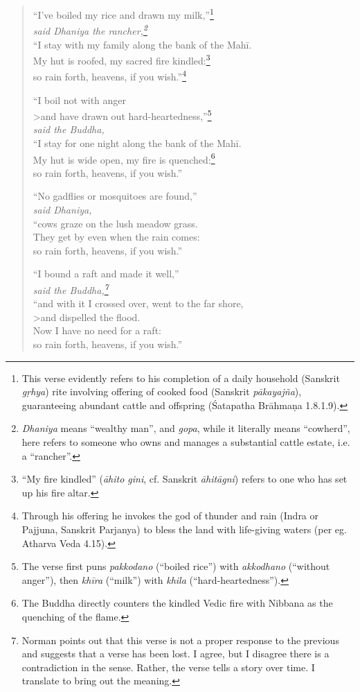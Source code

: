 \documentclass[12pt,openany]{book}%
\newcommand*{\scspeaker}[1]{\hspace{2em}\textit{#1}}
\begin{document}
\begin{verse}%
“I’ve boiled my rice and drawn my milk,”\footnote{This verse evidently refers to his completion of a daily household (Sanskrit \textit{\textsanskrit{gṛhya}}) rite involving offering of cooked food (Sanskrit \textit{\textsanskrit{pākayajña}}), guaranteeing abundant cattle and offspring (Śatapatha \textsanskrit{Brāhmaṇa} 1.8.1.9). } \\
\scspeaker{said Dhaniya the rancher,\footnote{\textit{Dhaniya} means “wealthy man”, and \textit{gopa}, while it literally means “cowherd”, here refers to someone who owns and manages a substantial cattle estate, i.e. a “rancher”. } }\\
“I stay with my family along the bank of the \textsanskrit{Mahī}. \\
My hut is roofed, my sacred fire kindled:\footnote{“My fire kindled” (\textit{\textsanskrit{āhito} gini}, cf. Sanskrit \textit{\textsanskrit{āhitāgni}}) refers to one who has set up his fire altar. } \\
so rain forth, heavens, if you wish.”\footnote{Through his offering he invokes the god of thunder and rain (Indra or Pajjuna, Sanskrit Parjanya) to bless the land with life-giving waters (per eg. Atharva Veda 4.15). } 

“I boil not with anger \\>and have drawn out hard-heartedness,”\footnote{The verse first puns \textit{pakkodano} (“boiled rice”) with \textit{akkodhano} (“without anger”), then \textit{\textsanskrit{khīra}} (“milk”) with \textit{khila} (“hard-heartedness”). } \\
\scspeaker{said the Buddha, }\\
“I stay for one night along the bank of the \textsanskrit{Mahī}. \\
My hut is wide open, my fire is quenched:\footnote{The Buddha directly counters the kindled Vedic fire with Nibbana as the quenching of the flame. } \\
so rain forth, heavens, if you wish.” 

“No gadflies or mosquitoes are found,” \\
\scspeaker{said Dhaniya, }\\
“cows graze on the lush meadow grass. \\
They get by even when the rain comes: \\
so rain forth, heavens, if you wish.” 

“I bound a raft and made it well,” \\
\scspeaker{said the Buddha,\footnote{Norman points out that this verse is not a proper response to the previous and suggests that a verse has been lost. I agree, but I disagree there is a contradiction in the sense. Rather, the verse tells a story over time. I translate to bring out the meaning. } }\\
“and with it I crossed over, went to the far shore, \\>and dispelled the flood. \\
Now I have no need for a raft: \\
so rain forth, heavens, if you wish.” 


\end{verse}
\end{document}
